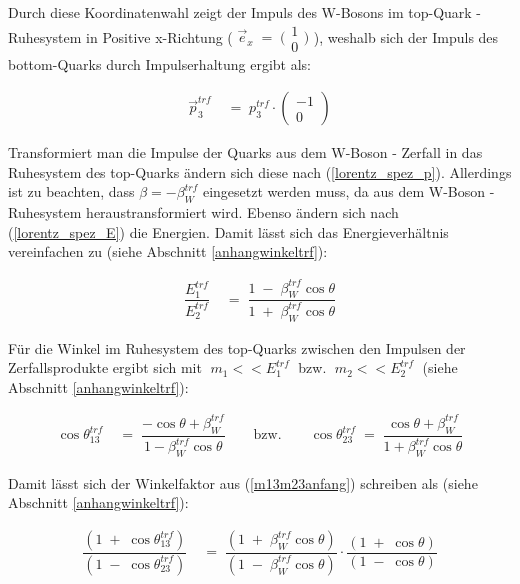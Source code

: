\documentclass[
a4paper,                                %
twoside,                                %
BCOR1.4cm,                      %
ngerman,                                %
10pt,                           %
headings=normal,                %
headsepline,                    %
clearplainpage, %
final,                                  %
div=14,
parskip=full
]{scrbook}
\begin{document}
Durch diese Koordinatenwahl zeigt der Impuls des W-Bosons im top-Quark - Ruhesystem in Positive x-Richtung (
$ \vec{e}_{x}\;=\;\bigl( \begin{smallmatrix}
			1 \\ 0
	\end{smallmatrix} \bigr) $
), weshalb sich der Impuls des bottom-Quarks durch Impulserhaltung ergibt als:

\begin{align*}
	\vec{p}_{3}^{trf}
\;&=\;
	p_{3}^{trf} \cdot
	\begin{pmatrix}
			-1 \\ 0
	\end{pmatrix}
\end{align*}

Transformiert man die Impulse der Quarks aus dem W-Boson - Zerfall in das Ruhesystem des top-Quarks \"andern sich diese nach (\ref{lorentz_spez_p}). Allerdings ist zu beachten, dass $ \beta = -\beta_{W}^{trf} $ eingesetzt werden muss, da aus dem W-Boson - Ruhesystem heraustransformiert wird. Ebenso \"andern sich nach (\ref{lorentz_spez_E}) die Energien. Damit l\"asst sich das Energieverh\"altnis vereinfachen zu (siehe Abschnitt \ref{anhangwinkeltrf}):

\begin{align}
	\dfrac{E_{1}^{trf}}{E_{2}^{trf}}
\;&=\;
	\dfrac{1\;-\;\beta_{W}^{trf} \cos \theta}
	{1\;+\;\beta_{W}^{trf} \cos \theta}
\end{align}

F\"ur die Winkel im Ruhesystem des top-Quarks zwischen den Impulsen der Zerfallsprodukte ergibt sich mit %
$ \;m_{1}<<E_{1}^{trf}\; $ 
bzw. 
$ \;m_{2}<<E_{2}^{trf}\; $ 
 (siehe Abschnitt \ref{anhangwinkeltrf}):

\begin{align}
	\cos \theta_{13}^{trf}
\;&=\;
	\dfrac{- \cos \theta + \beta_{W}^{trf}}
	{1 - \beta_{W}^{trf} \cos \theta}
\qquad \text{bzw.} \qquad
	\cos \theta_{23}^{trf}
\;=\;
	\dfrac{\cos \theta + \beta_{W}^{trf}}
	{1 + \beta_{W}^{trf} \cos \theta}
\end{align}

Damit l\"asst sich der Winkelfaktor aus (\ref{m13m23anfang}) schreiben als (siehe Abschnitt \ref{anhangwinkeltrf}):

\begin{align}
	\dfrac{\left( 1\;+\;\cos \theta_{13}^{trf} \right)}
	{\left( 1\;-\;\cos \theta_{23}^{trf} \right)}
\;&=\;
	\dfrac{\left( 1\;+\;\beta_{W}^{trf} \cos \theta \right)}
	{\left( 1\;-\;\beta_{W}^{trf} \cos \theta \right)}
	\cdot
	\dfrac{\left( 1\;+\;\cos \theta \right)}
	{\left( 1\;-\;\cos \theta \right)}
\end{align}
\end{document}
